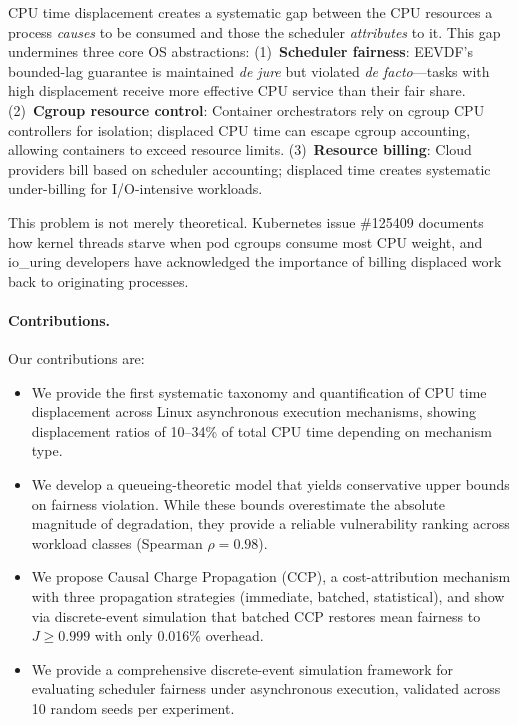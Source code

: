 \documentclass{article}
\begin{document}
CPU time displacement creates a systematic gap between the CPU resources a process \emph{causes} to be consumed and those the scheduler \emph{attributes} to it. This gap undermines three core OS abstractions: (1)~\textbf{Scheduler fairness}: EEVDF's bounded-lag guarantee is maintained \emph{de jure} but violated \emph{de facto}---tasks with high displacement receive more effective CPU service than their fair share. (2)~\textbf{Cgroup resource control}: Container orchestrators rely on cgroup CPU controllers for isolation; displaced CPU time can escape cgroup accounting, allowing containers to exceed resource limits. (3)~\textbf{Resource billing}: Cloud providers bill based on scheduler accounting; displaced time creates systematic under-billing for I/O-intensive workloads.

This problem is not merely theoretical. Kubernetes issue \#125409 documents how kernel threads starve when pod cgroups consume most CPU weight, and io\_uring developers have acknowledged the importance of billing displaced work back to originating processes.

\paragraph{Contributions.} Our contributions are:
\begin{itemize}
    \item We provide the first systematic taxonomy and quantification of CPU time displacement across Linux asynchronous execution mechanisms, showing displacement ratios of 10--34\% of total CPU time depending on mechanism type.
    \item We develop a queueing-theoretic model that yields conservative upper bounds on fairness violation. While these bounds overestimate the absolute magnitude of degradation, they provide a reliable vulnerability ranking across workload classes (Spearman $\rho = 0.98$).
    \item We propose Causal Charge Propagation (CCP), a cost-attribution mechanism with three propagation strategies (immediate, batched, statistical), and show via discrete-event simulation that batched CCP restores mean fairness to $J \geq 0.999$ with only 0.016\% overhead.
    \item We provide a comprehensive discrete-event simulation framework for evaluating scheduler fairness under asynchronous execution, validated across 10 random seeds per experiment.
\end{itemize}
\end{document}
